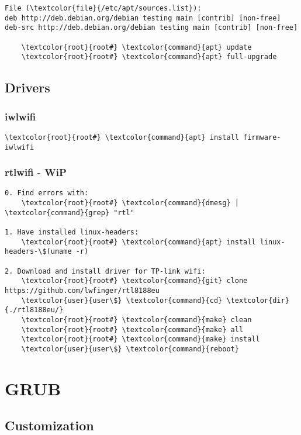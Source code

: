 \documentclass[10pt, a4paper, onecolumn, openany]{book} %
\begin{document}
\begin{Verbatim}[commandchars=\\\{\}]
File (\textcolor{file}{/etc/apt/sources.list}):
deb http://deb.debian.org/debian testing main [contrib] [non-free]
deb-src http://deb.debian.org/debian testing main [contrib] [non-free]

    \textcolor{root}{root#} \textcolor{command}{apt} update
    \textcolor{root}{root#} \textcolor{command}{apt} full-upgrade
\end{Verbatim}


\section{Drivers}
\subsection{iwlwifi}
\begin{Verbatim}[commandchars=\\\{\}]
    \textcolor{root}{root#} \textcolor{command}{apt} install firmware-iwlwifi
\end{Verbatim}
\subsection{rtlwifi - WiP}
\begin{Verbatim}[commandchars=\\\{\}]
0. Find errors with:
    \textcolor{root}{root#} \textcolor{command}{dmesg} | \textcolor{command}{grep} "rtl"
    
1. Have installed linux-headers:
    \textcolor{root}{root#} \textcolor{command}{apt} install linux-headers-\$(uname -r)

2. Download and install driver for TP-link wifi:
    \textcolor{root}{root#} \textcolor{command}{git} clone https://github.com/lwfinger/rtl8188eu
    \textcolor{user}{user\$} \textcolor{command}{cd} \textcolor{dir}{./rtl8188eu/}
    \textcolor{root}{root#} \textcolor{command}{make} clean
    \textcolor{root}{root#} \textcolor{command}{make} all
    \textcolor{root}{root#} \textcolor{command}{make} install
    \textcolor{user}{user\$} \textcolor{command}{reboot}
\end{Verbatim}


\chapter{GRUB}
\section{Customization}
\end{document}
